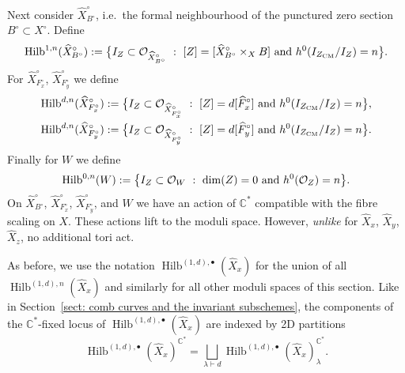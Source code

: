 \documentclass{amsart}
\theoremstyle{definition}
\newcommand{\CC} {\mathbb{C}}          %
\renewcommand{\O}{\mathcal{O}}
\newcommand{\Hilb}{\operatorname{Hilb}}
\newcommand{\CM}{\operatorname{CM}}
\newcommand{\Xhat}{\widehat{X}}
\begin{document}
Next consider $\Xhat ^{\circ}_{B^\circ}$, i.e.~the formal neighbourhood of the punctured zero section $B^\circ \subset X^\circ$. Define
$$
\Hilb^{1,n}(\Xhat ^{\circ}_{B^\circ}) := \big\{ I_Z \subset \O_{\Xhat ^{\circ}_{B^\circ}} \ : \ [Z] = [\Xhat ^{\circ}_{B^\circ} \times_X B] \ {\rm{and}} \ h^0(I_{Z_{\CM}} / I_Z) = n \big\}.
$$
For $\Xhat ^{\circ}_{F_{x}^{\circ}}$, $\Xhat ^{\circ}_{F_{y}^{\circ}}$ we define
\begin{align*}
\Hilb^{d,n}(\Xhat ^{\circ}_{F_{x}^{\circ}}) &:= \big\{ I_Z \subset \O_{\Xhat ^{\circ}_{F_{x}^{\circ}}} \ : \ [Z] = d [\widehat{F}_{x}^{\circ}] \ {\rm{and}} \ h^0(I_{Z_{\CM}} / I_Z) = n \big\}, \\
\Hilb^{d,n}(\Xhat ^{\circ}_{F_{y}^{\circ}}) &:= \big\{ I_Z \subset \O_{\Xhat ^{\circ}_{F_{y}^{\circ}}} \ : \ [Z] = d [\widehat{F}_{y}^{\circ}] \ {\rm{and}} \ h^0(I_{Z_{\CM}} / I_Z) = n \big\}.
\end{align*}
Finally for $W$ we define
$$
\Hilb^{0,n}(W) := \big\{ I_Z \subset \O_{W} \ : \ \dim(Z) = 0 \ {\rm{and}} \ h^0(\O_Z) = n \big\}.
$$
On $\Xhat ^{\circ}_{B^\circ}$, $\Xhat ^{\circ}_{F_{x}^{\circ}}$, $\Xhat ^{\circ}_{F_{y}^{\circ}}$, and $W$ we have an action of $\CC^*$ compatible with the fibre scaling on $X$. These actions lift to the moduli space. However, \emph{unlike} for $\Xhat _x$, $\Xhat _y$, $\Xhat _z$, no additional tori act.

As before, we use the notation $\Hilb^{(1,d),\bullet}(\Xhat _x)$ for
the union of all $\Hilb^{(1,d),n}(\Xhat _x)$ and similarly for all
other moduli spaces of this section. Like in Section~\ref{sect: comb
curves and the invariant subschemes}, the components of the
$\CC^*$-fixed locus of $\Hilb^{(1,d),\bullet}(\Xhat _x)$ are indexed
by 2D partitions
$$
\Hilb^{(1,d),\bullet}(\Xhat _x)^{\CC^*} = \bigsqcup_{\lambda \vdash d} \Hilb^{(1,d),\bullet}(\Xhat _x)_{\lambda}^{\CC^*}.
$$
\end{document}
